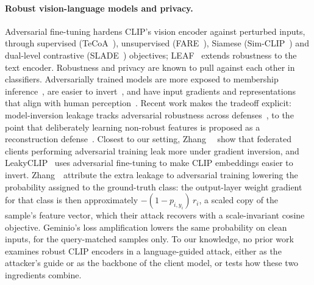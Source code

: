 \paragraph{Robust vision-language models and privacy.}
Adversarial fine-tuning hardens CLIP's vision encoder against perturbed inputs, through supervised (TeCoA~\cite{tecoa2023}), unsupervised (FARE~\cite{fare2024}), Siamese (Sim-CLIP~\cite{simclip2024}) and dual-level contrastive (SLADE~\cite{slade2025}) objectives; LEAF~\cite{leaf2025} extends robustness to the text encoder.
Robustness and privacy are known to pull against each other in classifiers.
Adversarially trained models are more exposed to membership inference~\cite{song2019privacy}, are easier to invert~\cite{mejia2019robustorprivate}, and have input gradients and representations that align with human perception~\cite{tsipras2019,santurkar2019,engstrom2019robustprior}.
Recent work makes the tradeoff explicit: model-inversion leakage tracks adversarial robustness across defenses~\cite{torp2026nonrobust,smith2026adaptivemi}, to the point that deliberately learning non-robust features is proposed as a reconstruction defense~\cite{torp2026nonrobust}.
Closest to our setting, Zhang~\etal~\cite{zhang2022privacyat} show that federated clients performing adversarial training leak more under gradient inversion, and LeakyCLIP~\cite{chen2026leakyclip} uses adversarial fine-tuning to make CLIP embeddings easier to invert.
Zhang~\etal\ attribute the extra leakage to adversarial training lowering the probability assigned to the ground-truth class: the output-layer weight gradient for that class is then approximately $-(1-p_{i,y_i})\,r_i$, a scaled copy of the sample's feature vector, which their attack recovers with a scale-invariant cosine objective. Geminio's loss amplification lowers the same probability on clean inputs, for the query-matched samples only.
To our knowledge, no prior work examines robust CLIP encoders in a language-guided attack, either as the attacker's guide or as the backbone of the client model, or tests how these two ingredients combine.
